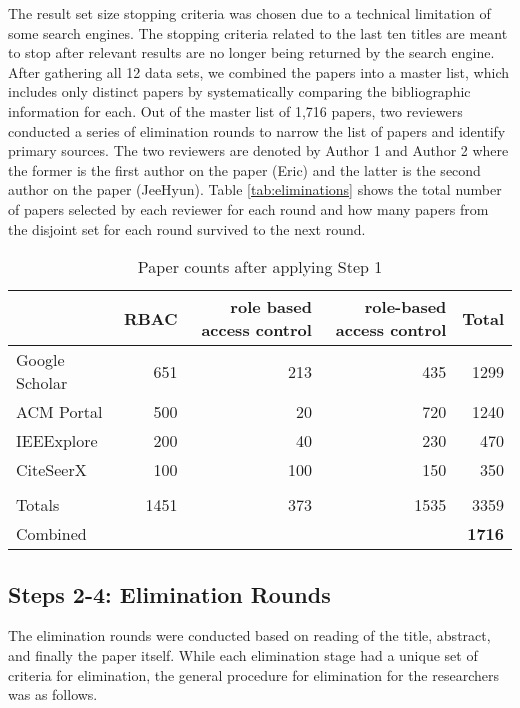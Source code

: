 The result set size stopping criteria was chosen due to a technical limitation of some search engines. 
The stopping criteria related to the last ten titles are meant to stop after relevant results are no longer being returned by the search engine. 
After gathering all 12 data sets, we combined the papers into a master list, which includes only distinct papers by systematically comparing the bibliographic information for each.
Out of the master list of 1,716 papers, two reviewers conducted a series of elimination rounds to narrow the list of papers and identify primary sources.
The two reviewers are denoted by Author 1 and Author 2 where the former is the first author on the paper (Eric) and the latter is the second author on the paper (JeeHyun).
Table \ref{tab:eliminations} shows the total number of papers selected by each reviewer for each round and how many papers from the disjoint set for each round survived to the next round.

\begin{table}
\centering
\caption{Paper counts after applying Step 1}
\vspace{0.1 in}
\begin{tabular}{ | l | r | r | r | r | }

\hline
 & 
\textbf{RBAC} & 
\textbf{role based access control} & 
\textbf{role-based access control} & 
\textbf{Total}
\\\hline

Google Scholar & 651 & 213 & 435 & 1299 \\\hline
ACM Portal & 500 & 20 & 720 & 1240 \\\hline
IEEExplore & 200 & 40 & 230 & 470 \\\hline
CiteSeerX & 100 & 100 & 150 & 350 \\\hline
 &  &  &  & \\\hline
Totals & 1451 & 373 & 1535 & 3359 \\\hline
Combined &  &  &  & \textbf{1716} \\\hline

\end{tabular}
\label{tab:search_results}
\end{table}

\subsection{Steps 2-4: Elimination Rounds}

The elimination rounds were conducted based on reading of the title, abstract, and finally the paper itself.  While each elimination stage had a unique set of criteria for elimination, the general procedure for elimination for the researchers was as follows.

